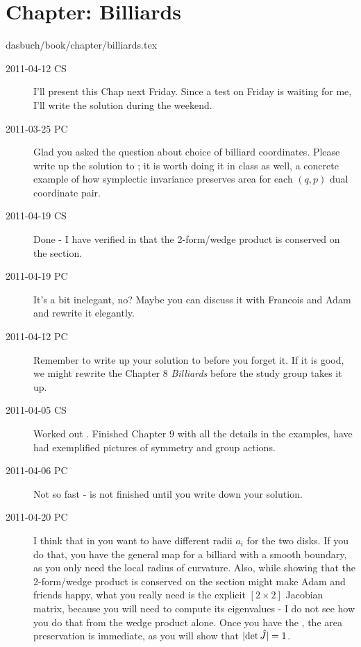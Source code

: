 \section{Chapter: Billiards}
\label{c-billiards}\noindent dasbuch/book/chapter/billiards.tex
\begin{description}

\item[2011-04-12 CS] I'll present this Chap next Friday. Since a
test on Friday is waiting for me, I'll write the solution during the weekend.

\item[2011-03-25 PC]
Glad you asked the question about choice of billiard coordinates. Please
write up the solution to ; it is worth doing it in
class as well, a concrete example of how symplectic invariance preserves
area for each $(q,p)$ dual coordinate  pair.

\item[2011-04-19 CS] Done - I have verified in  that
the 2-form/wedge product is conserved on the \Poincare section.

\item[2011-04-19 PC] It's a bit inelegant, no? Maybe you can discuss it with
Francois and Adam and rewrite it elegantly.

\item[2011-04-12 PC] Remember to write up your solution to
 before you forget it. If it is good, we might
rewrite the Chapter 8 {\em Billiards} before the study group takes it up.

\item[2011-04-05 CS] Worked out . Finished Chapter 9
with all the details in the examples, have had exemplified pictures of
symmetry and group actions.

\item[2011-04-06 PC] Not so fast -  is not finished
until you write down your solution.

\item[2011-04-20 PC]  I think that in  you want to
have different radii $a_i$ for the two disks. If you do that, you have
the general map for a billiard with a smooth boundary, as you only need the
local radius of curvature. Also, while showing that
the 2-form/wedge product is conserved on the \Poincare section might make
Adam and friends happy, what you really need is the explicit $[2\!\times\!2]$
Jacobian matrix, because you will need to compute its eigenvalues - I do not see
how you do that from the wedge product alone. Once you have the \jacobianM,
the area preservation is immediate, as you will show that $|\mbox{\rm det}\, \hat{J} |= 1$.


\end{description}
